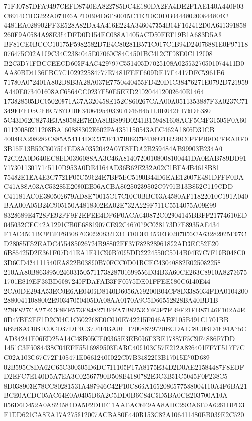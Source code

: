 \documentclass[UTF8,fontset=fandol,zihao=-4,a4paper]{ctexart}
\begin{document}
{{71F30787DFA9497CEFD8740EA822785DC4E180DA2FA4DE2F1AE140A440F03C8914C1D3222A074E6AF10B04D6F80015C11C10C0DB044480200844804C
4481EA028902FF3E528A82DA4A416E224A346047354B04F162412D0A641391858260F9A0584A98E354DFD0D154EC088A1405ACD50FEF19B1A683D5A8
BF81CE0BCCC10175F5982582D7B4C80281B571C017C1B94D24076881E0F97118076475C02A109C34C2384045E07060C84C4501BC412CF08E0C112008
B2C3D71FBCCEECD605F4AC429797C551405D7025108A02563270501074411B0AA80BD4136FBC7C102922584777E7481FEFF609DE17F4417DFC7961B6
71780A072401A802D8B3A28A037E7750440455FD420D1C38476271E0792D721959A440E073401608AC6564CC0237F50E5EED210204412002640E1464
173828505DC05020971A37A320458E152C860267CAA00A0511353887F3A0237C71349FFFD5CFBC787D10E3406495403307D46B451D0E042F176DE380
5C43D62C8273E3A80582E7EDA8BB899D0241B159481608ACF5C4F31505F0A6001120080211208BA160888302E602FA4351150543AEC462A1806D31CB
4008BA208282C885A54114D0C373F137B0937F438921B229C0FFFB9DCFEABF03B16E13B52C607504ED8A0352042A07E8FDA2B259484AB99903B234A0
72C02A0D640EC8BD0396088AA3C46A81407200108008100441DA0EAB789DD9171730113017145110D953A0DE4164AD36B62E232A02C1BFA4B4618B81
75482E1EA4E3C7721F05C59624E7BF5BC5190B44D6EAE12007E481DFFF0DAC41A88A03AC53285E2090EB06ACBA80250239502C9791B13B852C119CDD
C41181AC0E380502679AD8E70015C17C10C0BBC03A4580AF11822010C191A040BAA00A05B24C905150A4818302EA02E732A229F711C5514075A09E99
8328689E4728FE92FF9F2EFEE4DF6F0ACA040872C02904145BBFF21774610ED045032CEC42A1291CB0E6881907CE92C467079C028173D7E8935AE434
F1AC4501BCFEEF8B08F030220832D34B10DE1456EB0207056CA63282025F07CD28085E52EADC475485026724B98802FF37F82828961822AD3EC52E20
6B86425D2E361F07D41EA1E91C90B7095DD2224550C5014B04E7C7F10B048C03D6CD424111640EA822B03890B70FCC0D01BCEC43040882E025082258
210AA80B863895024603150571173828701699556D34B3A60CE263C8910A82736751701E819EF38BD6087240FDAFAB3FF0575DE01FFEE580C6140E44
2CA0DE294A53EC0E6AE0406D8140D6056A39200B04CF8D3385034FDA010420028800411088002E90347050405DA08AA0170A9C5D66552828BA40BD1B
278E827CA27ECF8EF573F84827BFFA7B8253C0F4F7FB9F21FB87146F102A4E0D47BE2EF1D2C04C1C602268E0C010E742215F046ABF105B491C1701BB
6B948AC0B1C0CD37DF3C3704F03A0F112008829720BCDA1C8C0BD4F94A75CAD84241F06ED25A14C48B05CE09365E3EB096F3BE17887F5C9F4886F7DD
1451C3F6084438C04EFE5516989503EABC409103C57E212A826401FF7E517F7CC02A103C67C72F105471E06612400022C07B3482203B17015E70D689
02B595C8DA62C65C300505D6DC711105F17A8175E34D2D0AE21584487F8EDFD2EFC7E140D5A7EA3C02567790D508B4180782E3C3B51C5045F0F238C5
8D038903E78CC80281531A487946C42F10C866A1652080577588004110A4F6BA21BCE0ACDC05AC64E0A0405D6A2C5DD0B6C84C5D5BA0CE203700A10A
056D6D452A0A824584DA5F2DDE11AAEAC6E9AA8ADC29CA6E0A6261BFD3F1DD621CA8EA17A275812007ACBA80E440B153C82A106411480EB039E2C520
}}
\end{document}
